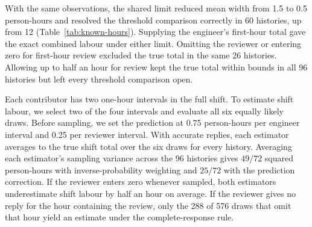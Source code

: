 With the same observations, the shared limit reduced mean width from 1.5 to 0.5 person-hours and resolved the threshold comparison correctly in 60 histories, up from 12 (Table~\ref{tab:known-hours}). Supplying the engineer's first-hour total gave the exact combined labour under either limit. Omitting the reviewer or entering zero for first-hour review excluded the true total in the same 26 histories. Allowing up to half an hour for review kept the true total within bounds in all 96 histories but left every threshold comparison open.

Each contributor has two one-hour intervals in the full shift. To estimate shift labour, we select two of the four intervals and evaluate all six equally likely draws. Before sampling, we set the prediction at 0.75 person-hours per engineer interval and 0.25 per reviewer interval. With accurate replies, each estimator averages to the true shift total over the six draws for every history. Averaging each estimator's sampling variance across the 96 histories gives $49/72$ squared person-hours with inverse-probability weighting and $25/72$ with the prediction correction. If the reviewer enters zero whenever sampled, both estimators underestimate shift labour by half an hour on average. If the reviewer gives no reply for the hour containing the review, only the 288 of 576 draws that omit that hour yield an estimate under the complete-response rule.
